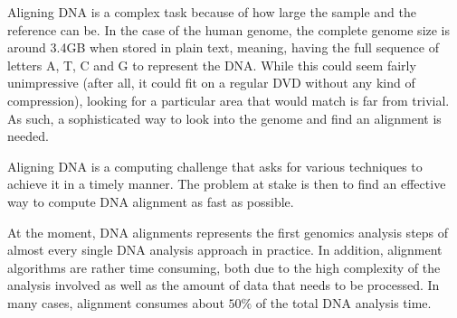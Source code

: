 Aligning DNA is a complex task because of how large the sample and the reference can be. In the case of the human genome, the complete genome size is around 3.4GB when stored in plain text, meaning, having the full sequence of letters A, T, C and G to represent the DNA. While this could seem fairly unimpressive (after all, it could fit on a regular DVD without any kind of compression), looking for a particular area that would match is far from trivial. As such, a sophisticated way to look into the genome and find an alignment is needed.

Aligning DNA is a computing challenge that asks for various techniques to achieve it in a timely manner. The problem at stake is then to find an effective way to compute DNA alignment as fast as possible.

At the moment, DNA alignments represents the first genomics analysis steps of almost every single DNA analysis approach in practice. In addition, alignment algorithms are rather time consuming, both due to the high complexity of the analysis involved as well as the amount of data that needs to be processed. In many cases, alignment consumes about $50\%$ of the total DNA analysis time. 

